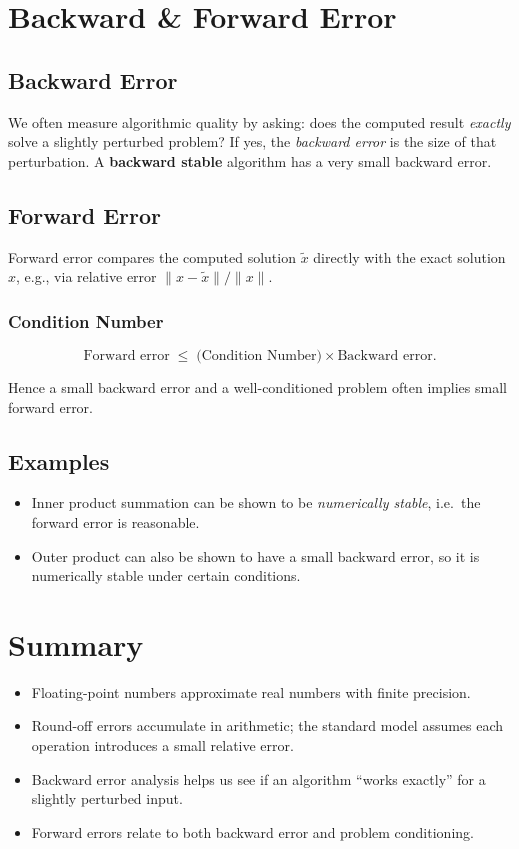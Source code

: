 \documentclass[12pt]{article}
\begin{document}
\section*{Backward \& Forward Error}

\subsection*{Backward Error}
We often measure algorithmic quality by asking: does the computed result \emph{exactly} solve a slightly perturbed problem? If yes, the \emph{backward error} is the size of that perturbation. A \textbf{backward stable} algorithm has a very small backward error.

\subsection*{Forward Error}
Forward error compares the computed solution \(\widetilde{x}\) directly with the exact solution \(x\), e.g., via relative error \(\|x - \widetilde{x}\|/\|x\|\).

\subsubsection*{Condition Number}
\[
\text{Forward error} \;\le\; \text{(Condition Number)} \times \text{Backward error}.
\]

Hence a small backward error and a well-conditioned problem often implies small forward error.

\subsection*{Examples}
\begin{itemize}
    \item Inner product summation can be shown to be \emph{numerically stable}, i.e.\ the forward error is reasonable.
    \item Outer product can also be shown to have a small backward error, so it is numerically stable under certain conditions.
\end{itemize}

\section*{Summary}
\begin{itemize}
    \item Floating-point numbers approximate real numbers with finite precision.
    \item Round-off errors accumulate in arithmetic; the standard model assumes each operation introduces a small relative error.
    \item Backward error analysis helps us see if an algorithm “works exactly” for a slightly perturbed input.
    \item Forward errors relate to both backward error and problem conditioning.
\end{itemize}
\end{document}
